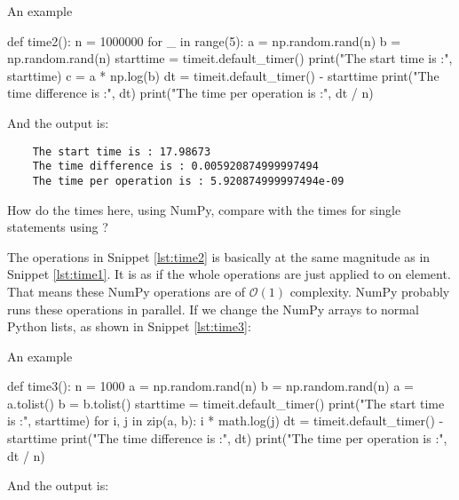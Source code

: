 \begin{algorithm}[H]
    \caption{An example}
    \label{lst:time2}
    \begin{pythoncode}
        def time2():
            n = 1000000
            for _ in range(5):
                a = np.random.rand(n)
                b = np.random.rand(n)
            starttime = timeit.default_timer()
            print("The start time is :", starttime)
            c = a * np.log(b)
            dt = timeit.default_timer() - starttime
            print("The time difference is :", dt)
            print("The time per operation is :", dt / n)
    \end{pythoncode}
\end{algorithm}

And the output is:

\begin{verbatim}
    The start time is : 17.98673
    The time difference is : 0.005920874999997494
    The time per operation is : 5.920874999997494e-09
\end{verbatim}

\Question How do the times here, using NumPy, compare with the times for single
statements using ?

The operations in Snippet \ref{lst:time2} is basically at the same magnitude as
in Snippet \ref{lst:time1}. It is as if the whole operations are just applied to
on element. That means these NumPy operations are of $\mathcal{O}(1)$ complexity.
NumPy probably runs these operations in parallel.
If we change the NumPy arrays to normal Python lists, as shown in Snippet \ref{lst:time3}:

\begin{algorithm}[H]
    \caption{An example}
    \label{lst:time3}
    \begin{pythoncode}
        def time3():
            n = 1000
            a = np.random.rand(n)
            b = np.random.rand(n)
            a = a.tolist()
            b = b.tolist()
            starttime = timeit.default_timer()
            print("The start time is :", starttime)
            for i, j in zip(a, b):
                i * math.log(j)
            dt = timeit.default_timer() - starttime
            print("The time difference is :", dt)
            print("The time per operation is :", dt / n)
        \end{pythoncode}
\end{algorithm}

And the output is:

